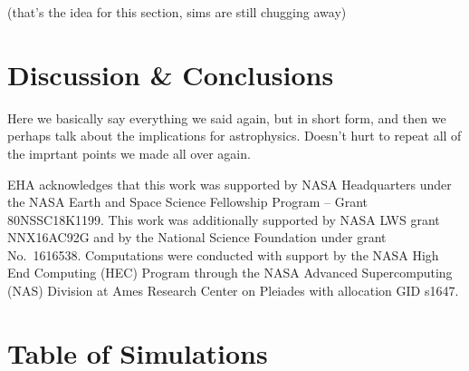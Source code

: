 \documentclass[aps, pre, onecolumn, nofootinbib, notitlepage, groupedaddress, amsfonts, amssymb, amsmath, longbibliography]{revtex4-1}
\begin{document}
(that's the idea for this section, sims are still chugging away)



\section{Discussion \& Conclusions}
\label{sec:discussion}

Here we basically say everything we said again, but in short form, and then we perhaps talk about the implications for astrophysics.
Doesn't hurt to repeat all of the imprtant points we made all over again.


\begin{acknowledgments}
EHA acknowledges that this work was supported by NASA Headquarters under the NASA Earth and Space Science Fellowship Program -- Grant 80NSSC18K1199.
This work was additionally supported by NASA LWS grant NNX16AC92G and by the National Science Foundation under grant No.~1616538. 
Computations were conducted with support by the NASA High End Computing (HEC) Program through the NASA  Advanced Supercomputing (NAS) Division at Ames Research Center on Pleiades with allocation GID s1647.
\end{acknowledgments}




\appendix
\section{Table of Simulations}
\label{app:table}
\end{document}
